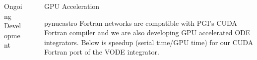 \documentclass[final]{beamer}
\newlength{\sepwid}
\newlength{\onecolwid}
\newlength{\twocolwid}
\begin{document}
\begin{frame}[t]
\begin{columns}[t]
\begin{column}{\twocolwid}
\begin{columns}[t,totalwidth=\twocolwid]
\begin{column}{\onecolwid}
\begin{block}{Ongoing Development}
\end{block}


\end{column} %

\end{columns} %






\end{column} %

\begin{column}{\sepwid}\end{column} %

\begin{column}{\onecolwid} %


\begin{block}{GPU Acceleration}

pynucastro Fortran networks are compatible with PGI's CUDA Fortran compiler and we are also developing GPU accelerated ODE integrators. Below is speedup (serial time/GPU time) for our CUDA Fortran port of the VODE \cite{VODE.1989} integrator.


\end{block}
\end{column}
\end{columns}
\end{frame}
\end{document}
